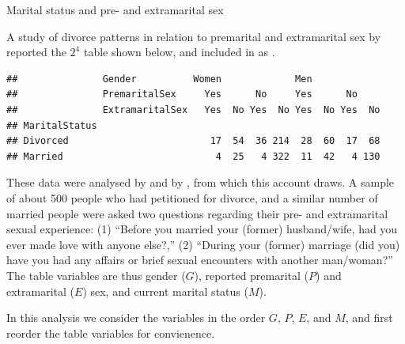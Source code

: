 \documentclass[11pt]{book}
\renewenvironment{knitrout}{\small\renewcommand{\baselinestretch}{.85}}{} %
\begin{document}
\begin{Example}[marital1]{Marital status and pre- and extramarital sex}

A study of divorce patterns in relation to premarital and extramarital sex
by \citet{ThornesCollard:79} reported
the \(2^4\) table shown below, and included in  as
.

\begin{knitrout}
\color{fgcolor}\begin{kframe}
\begin{alltt}
\hlstd{(}\hlstd{,} \hlstd{=}\hlstd{)}
\hlopt{+}\hlopt{+} \hlopt{~} 
\end{alltt}
\begin{verbatim}
##               Gender          Women             Men            
##               PremaritalSex     Yes      No     Yes      No    
##               ExtramaritalSex   Yes  No Yes  No Yes  No Yes  No
## MaritalStatus                                                  
## Divorced                         17  54  36 214  28  60  17  68
## Married                           4  25   4 322  11  42   4 130
\end{verbatim}
\end{kframe}
\end{knitrout}

These data were analysed by \citet[\S 6.1.7]{Agresti:2013}
and by \citet{Friendly:94a,Friendly:00:VCD}, from which this account draws.
A sample of
about 500 people who had petitioned for divorce, and a similar number
of married people were asked two questions regarding their pre- and
extramarital sexual experience:  (1) ``Before you married your
(former) husband/wife, had you ever made love with anyone else?,''
(2) ``During your (former) marriage (did you) have you had any
affairs or brief sexual encounters with another man/woman?'' 
The
table variables are thus gender ($G$), reported premarital ($P$)
and extramarital ($E$) sex, and current marital status ($M$).

In this analysis we consider the variables in the order $G$, $P$,
$E$, and $M$, and first reorder the table variables for
convienence.
\begin{knitrout}
\color{fgcolor}\begin{kframe}
\begin{alltt}
 \hlkwb{<-}  \hlopt{:}\hlstd{)}   
\end{alltt}
\end{kframe}
\end{knitrout}



\end{Example}
\end{document}
